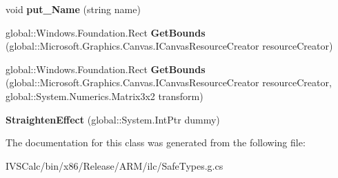 \begin{DoxyCompactItemize}
void {\bfseries put\+\_\+\+Name} (string name)
\item 
\mbox{\label{class_microsoft_1_1_graphics_1_1_canvas_1_1_effects_1_1_straighten_effect_af64b502b0dd6c00643c16be7bcfdcef7}} 
global\+::\+Windows.\+Foundation.\+Rect {\bfseries Get\+Bounds} (global\+::\+Microsoft.\+Graphics.\+Canvas.\+I\+Canvas\+Resource\+Creator resource\+Creator)
\item 
\mbox{\label{class_microsoft_1_1_graphics_1_1_canvas_1_1_effects_1_1_straighten_effect_ad03b4480cb1a04a86f955f4367f7a990}} 
global\+::\+Windows.\+Foundation.\+Rect {\bfseries Get\+Bounds} (global\+::\+Microsoft.\+Graphics.\+Canvas.\+I\+Canvas\+Resource\+Creator resource\+Creator, global\+::\+System.\+Numerics.\+Matrix3x2 transform)
\item 
\mbox{\label{class_microsoft_1_1_graphics_1_1_canvas_1_1_effects_1_1_straighten_effect_aa615746cf5c95aaca45a53174de77830}} 
{\bfseries Straighten\+Effect} (global\+::\+System.\+Int\+Ptr dummy)
\end{DoxyCompactItemize}


The documentation for this class was generated from the following file\+:\begin{DoxyCompactItemize}
\item 
I\+V\+S\+Calc/bin/x86/\+Release/\+A\+R\+M/ilc/Safe\+Types.\+g.\+cs\end{DoxyCompactItemize}
